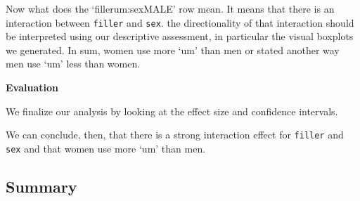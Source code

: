 \documentclass[
]{article}
\newenvironment{Shaded}{\begin{snugshade}}{\end{snugshade}}
\newcommand{\CommentTok}[1]{\textcolor[rgb]{0.56,0.35,0.01}{\textit{#1}}}
\newcommand{\DecValTok}[1]{\textcolor[rgb]{0.00,0.00,0.81}{#1}}
\newcommand{\FunctionTok}[1]{\textcolor[rgb]{0.00,0.00,0.00}{#1}}
\newcommand{\NormalTok}[1]{#1}
\newcommand{\OtherTok}[1]{\textcolor[rgb]{0.56,0.35,0.01}{#1}}
\newcommand{\SpecialCharTok}[1]{\textcolor[rgb]{0.00,0.00,0.00}{#1}}
\begin{document}
Now what does the `fillerum:sexMALE' row mean. It means that there is an interaction between \texttt{filler} and \texttt{sex}. the directionality of that interaction should be interpreted using our descriptive assessment, in particular the visual boxplots we generated. In sum, women use more `um' than men or stated another way men use `um' less than women.

\textbf{Evaluation}

We finalize our analysis by looking at the effect size and confidence intervals.

\begin{Shaded}
\end{Shaded}

We can conclude, then, that there is a strong interaction effect for \texttt{filler} and \texttt{sex} and that women use more `um' than men.

\hypertarget{summary-10}{%
\subsection{Summary}\label{summary-10}}
\end{document}
